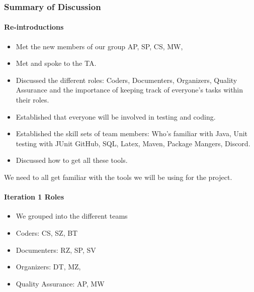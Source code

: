 \documentclass[10pt, a4paper]{article}
\begin{document}
			
			\subsubsection{Summary of Discussion }
			\paragraph{Re-introductions }
			\begin{itemize}
				\item Met the new members of our group AP, SP, CS, MW, 
				\item Met and spoke to the TA. 
				\item	Discussed the different roles: Coders, Documenters, Organizers, Quality Assurance and the importance of keeping track of everyone’s tasks within their roles. 
				\item Established that everyone will be involved in testing and coding. 
				\item Established the skill sets of team members: Who’s familiar with Java, Unit testing with JUnit GitHub, SQL, Latex, Maven, Package Mangers, Discord.
				\item Discussed how to get all these tools.
			\end{itemize}
			We need to all get familiar with the tools we will be using for the project.
			
			\paragraph{Iteration 1 Roles}
			\begin{itemize}
				\item We grouped into the different teams
				\item Coders: CS, SZ, BT
				\item Documenters: RZ, SP, SV
				\item Organizers: DT, MZ, 
				\item Quality Assurance: AP, MW 
			\end{itemize}
			
\end{document}
